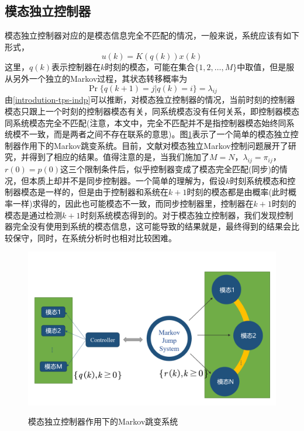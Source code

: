 	\subsection{模态独立控制器}
	模态独立控制器对应的是模态信息完全不匹配的情况，一般来说，系统应该有如下形式，
	\begin{equation}
	u(k)=K(q(k))x(k)
	\end{equation}
	这里，$q(k)$表示控制器在$k$时刻的模态，可能在集合$\{1,2,\dots,M \}$中取值，但是服从另外一个独立的Markov过程，其状态转移概率为
	\begin{equation}\label{introdution-tps-indp}
	\Pr\{q(k+1)=j|q(k)=i \}=\lambda_{ij}
	\end{equation}
	由\eqref{introdution-tps-indp}可以推断，对模态独立控制器的情况，当前时刻的控制器模态只跟上一个时刻的控制器模态有关，同系统模态没有任何关系，即控制器模态同系统模态完全不匹配(注意，本文中，完全不匹配并不是指控制器模态始终同系统模不一致，而是两者之间不存在联系的意思)。图\ref{intro_fig_idpsys}表示了一个简单的模态独立控制器作用下的Markov跳变系统。目前，文献\cite{todorov2016new,wu2005mode,dolgov2017static}对模态独立Markov控制问题展开了研究，并得到了相应的结果。值得注意的是，当我们施加了$M=N$，$\lambda_{ij}=\pi_{ij}$，$r(0)=p(0)$这三个限制条件后，似乎控制器变成了模态完全匹配(同步)的情况，但本质上却并不是同步控制器。一个简单的理解为，假设$k$时刻系统模态和控制器模态是一样的，但是由于控制器和系统在$k+1$时刻的模态都是由概率(此时概率一样)求得的，因此也可能模态不一致，而同步控制器里，控制器在$k+1$时刻的模态是通过检测$k+1$时刻系统模态得到的。对于模态独立控制器，我们发现控制器完全没有使用到系统的模态信息，这可能导致的结果就是，最终得到的结果会比较保守，同时，在系统分析时也相对比较困难。
	
	\begin{figure}[!htb] 
		\centering\includegraphics[scale=0.25]{./figures/introduction/idpsys.png}\\ 
		\caption{模态独立控制器作用下的Markov跳变系统}
		\label{intro_fig_idpsys}
	\end{figure}
	
